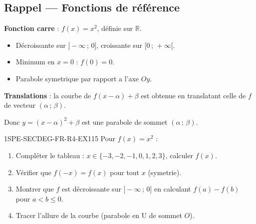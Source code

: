

\subsection*{Rappel — Fonctions de référence}

\textbf{Fonction carre} : $f(x) = x^2$, définie sur $\mathbb{R}$.
\begin{itemize}
  \item Décroissante sur $]-\infty\,;\,0]$, croissante sur $[0\,;\,+\infty[$.
  \item Minimum en $x = 0$ : $f(0) = 0$.
  \item Parabole symetrique par rapport a l'axe $Oy$.
\end{itemize}

\textbf{Translations} : la courbe de $f(x-\alpha) + \beta$ est obtenue en translatant celle de $f$ de vecteur $(\alpha\,;\,\beta)$.

Donc $y = (x-\alpha)^2 + \beta$ est une parabole de sommet $(\alpha\,;\,\beta)$.


\begin{exercice}{1SPE-SECDEG-FR-R4-EX1}{1}{5}
Pour $f(x) = x^2$ :
\begin{enumerate}
  \item Compléter le tableau : $x \in \{-3, -2, -1, 0, 1, 2, 3\}$, calculer $f(x)$.
  \item Vérifier que $f(-x) = f(x)$ pour tout $x$ (symetrie).
  \item Montrer que $f$ est décroissante sur $]-\infty\,;\,0]$ en calculant $f(a) - f(b)$ pour $a < b \leq 0$.
  \item Tracer l'allure de la courbe (parabole en U de sommet $O$).
\end{enumerate}
\end{exercice}


